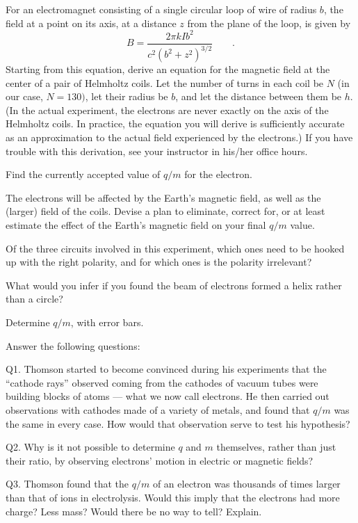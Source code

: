 \prelabquestion  For an electromagnet consisting of a single circular
loop of wire of radius $b$, the field at a point on its
axis, at a distance $z$ from the plane of the loop, is given by
\begin{equation*}
      B = \frac{2\pi kIb^2}{ c^2( b^2+ z^2)^{3/2}} \qquad .
\end{equation*}
Starting from this equation, derive an equation for the
magnetic field at the center of a pair of Helmholtz coils.
Let the number of turns in each coil be $N$ (in our case,
$N=130)$, let their radius be $b$, and let the distance
between them be $h$. (In the actual experiment, the
electrons are never exactly on the axis of the Helmholtz
coils. In practice, the equation you will derive is
sufficiently accurate as an approximation to the actual
field experienced by the electrons.) If you have trouble
with this derivation, see your instructor in his/her office hours.

\prelabquestion  Find the currently accepted value of $q/m$ for the electron.

\prelabquestion  The electrons will be affected by the Earth's magnetic
field, as well as the (larger) field of the coils. Devise a
plan to eliminate, correct for, or at least estimate the
effect of the Earth's magnetic field on your final $q/m$ value.

\prelabquestion  Of the three circuits involved in this experiment, which
ones need to be hooked up with the right polarity, and for
which ones is the polarity irrelevant?

\prelabquestion  What would you infer if you found the beam of electrons
formed a helix rather than a circle?

\analysis

Determine $q/m$, with error bars.

Answer the following questions:

Q1. Thomson started to become convinced during his
experiments that the ``cathode rays'' observed coming from
the cathodes of vacuum tubes were building blocks of atoms
--- what we now call electrons. He then carried out
observations with cathodes made of a variety of metals, and
found that $q/m$ was the same in every case. How would that
observation serve to test his hypothesis?

Q2. Why is it not possible to determine $q$ and $m$
themselves, rather than just their ratio, by observing
electrons' motion in electric or magnetic fields?

Q3. Thomson found that the $q/m$ of an electron was
thousands of times larger than that of ions in electrolysis.
Would this imply that the electrons had more charge? Less
mass? Would there be no way to tell? Explain.
